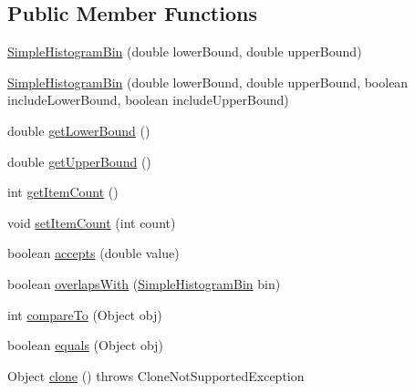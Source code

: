 \subsection*{Public Member Functions}
\begin{DoxyCompactItemize}
\item 
\mbox{\hyperlink{classorg_1_1jfree_1_1data_1_1statistics_1_1_simple_histogram_bin_a9492657b78a487d4edd4bdb72beb1145}{Simple\+Histogram\+Bin}} (double lower\+Bound, double upper\+Bound)
\item 
\mbox{\hyperlink{classorg_1_1jfree_1_1data_1_1statistics_1_1_simple_histogram_bin_ae87177f6f3c618217771e90350917856}{Simple\+Histogram\+Bin}} (double lower\+Bound, double upper\+Bound, boolean include\+Lower\+Bound, boolean include\+Upper\+Bound)
\item 
double \mbox{\hyperlink{classorg_1_1jfree_1_1data_1_1statistics_1_1_simple_histogram_bin_a265bd97447656be63bfad84f442afd18}{get\+Lower\+Bound}} ()
\item 
double \mbox{\hyperlink{classorg_1_1jfree_1_1data_1_1statistics_1_1_simple_histogram_bin_a3212445be3a9ead3eedc4d5070d5ad33}{get\+Upper\+Bound}} ()
\item 
int \mbox{\hyperlink{classorg_1_1jfree_1_1data_1_1statistics_1_1_simple_histogram_bin_ac240ee9dca3b67a3f8e95b0c91e43bf0}{get\+Item\+Count}} ()
\item 
void \mbox{\hyperlink{classorg_1_1jfree_1_1data_1_1statistics_1_1_simple_histogram_bin_af592b6fca687f42fc11fda590b61d9d3}{set\+Item\+Count}} (int count)
\item 
boolean \mbox{\hyperlink{classorg_1_1jfree_1_1data_1_1statistics_1_1_simple_histogram_bin_a749cd9b5b2c266a2a8ca4608d444e1a6}{accepts}} (double value)
\item 
boolean \mbox{\hyperlink{classorg_1_1jfree_1_1data_1_1statistics_1_1_simple_histogram_bin_ac2eb609b8721c86c1604762283d21d11}{overlaps\+With}} (\mbox{\hyperlink{classorg_1_1jfree_1_1data_1_1statistics_1_1_simple_histogram_bin}{Simple\+Histogram\+Bin}} bin)
\item 
int \mbox{\hyperlink{classorg_1_1jfree_1_1data_1_1statistics_1_1_simple_histogram_bin_a58741825948ef732cc8ec35df1b52041}{compare\+To}} (Object obj)
\item 
boolean \mbox{\hyperlink{classorg_1_1jfree_1_1data_1_1statistics_1_1_simple_histogram_bin_a1cdc82e17352b00dbd989d19eb7ae011}{equals}} (Object obj)
\item 
Object \mbox{\hyperlink{classorg_1_1jfree_1_1data_1_1statistics_1_1_simple_histogram_bin_a2f3219216624a143825a9e4a56631019}{clone}} ()  throws Clone\+Not\+Supported\+Exception 
\end{DoxyCompactItemize}


